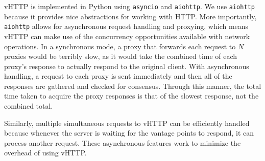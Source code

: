 vHTTP is implemented in Python using \texttt{asyncio} and \texttt{aiohttp}.
We use \texttt{aiohttp} because it provides nice abstractions for working with
HTTP. More importantly, \texttt{aiohttp} allows for asynchronous request
handling and proxying, which means vHTTP can make use of the concurrency
opportunities available with network operations. In a synchronous mode, a
proxy that forwards each request to $N$ proxies would be terribly slow, as it
would take the combined time of each proxy's response to actually respond to
the original client. With asynchronous handling, a request to each proxy is
sent immediately and then all of the responses are gathered and checked for
consensus. Through this manner, the total time taken to acquire the proxy
responses is that of the slowest response, not the combined total.

Similarly, multiple simultaneous requests to vHTTP can be efficiently handled
because whenever the server is waiting for the vantage points to respond, it
can process another request. These asynchronous features work to minimize
the overhead of using vHTTP.
